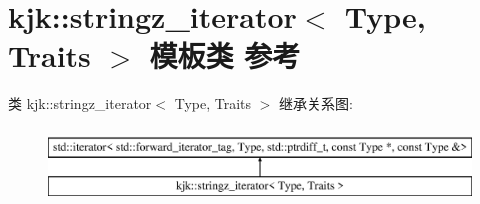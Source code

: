 \hypertarget{classkjk_1_1stringz__iterator}{}\section{kjk\+:\+:stringz\+\_\+iterator$<$ Type, Traits $>$ 模板类 参考}
\label{classkjk_1_1stringz__iterator}
类 kjk\+:\+:stringz\+\_\+iterator$<$ Type, Traits $>$ 继承关系图\+:\begin{figure}[H]
\begin{center}
\leavevmode
\includegraphics[height=2.000000cm]{classkjk_1_1stringz__iterator}
\end{center}
\end{figure}
